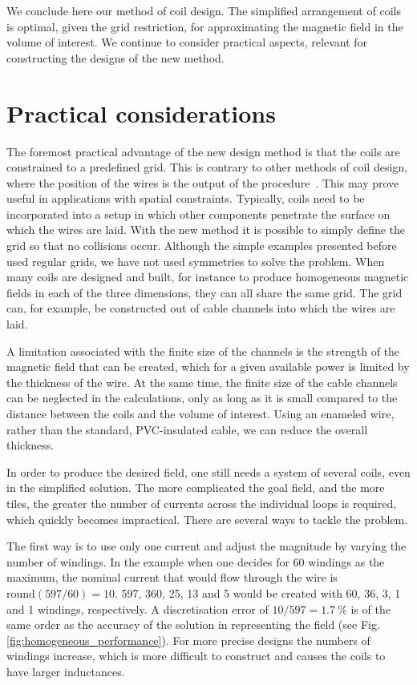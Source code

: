 We conclude here our method of coil design.
The simplified arrangement of coils is optimal, given the grid restriction, for approximating the magnetic field in the volume of interest.
We continue to consider practical aspects, relevant for constructing the designs of the new method.



\newpage
\section{Practical considerations}
The foremost practical advantage of the new design method is that the coils are constrained to a predefined grid.
This is contrary to other methods of coil design, where the position of the wires is the output of the procedure~\cite{Turner1993, Beidler1990}. This may prove useful in applications with spatial constraints.
Typically, coils need to be incorporated into a setup in which other components penetrate the surface on which the wires are laid.
With the new method it is possible to simply define the grid so that no collisions occur.
Although the simple examples presented before used regular grids, we have not used symmetries to solve the problem.
When many coils are designed and built, for instance to produce homogeneous magnetic fields in each of the three dimensions, they can all share the same grid.
The grid can, for example, be constructed out of cable channels into which the wires are laid.

A limitation associated with the finite size of the channels is the strength of the magnetic field that can be created, which for a given available power is limited by the thickness of the wire.
At the same time, the finite size of the cable channels can be neglected in the calculations, only as long as it is small compared to the distance between the coils and the volume of interest.
Using an enameled wire, rather than the standard, PVC-insulated cable, we can reduce the overall thickness.

In order to produce the desired field, one still needs a system of several coils, even in the simplified solution.
The more complicated the goal field, and the more tiles, the greater the number of currents across the individual loops is required, which quickly becomes impractical.
There are several ways to tackle the problem.

The first way is to use only one current and adjust the magnitude by varying the number of windings.
In the example when one decides for \num{60} windings as the maximum, the nominal current that would flow through the wire is $\mathrm{round}(597 / 60) = 10$.
 \num{597}, \num{360}, \num{25}, \num{13} and \num{5} would be created with \num{60}, \num{36}, \num{3}, \num{1} and \num{1} windings, respectively.
A discretisation error of $10 / 597 = \SI{1.7}{\percent}$ is of the same order as the accuracy of the solution in representing the field (see Fig.\,\ref{fig:homogeneous_performance}).
For more precise designs the numbers of windings increase, which is more difficult to construct and causes the coils to have larger inductances.

